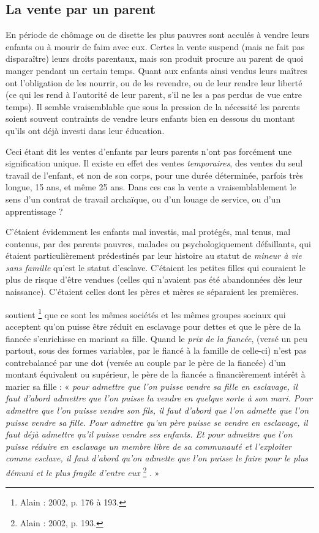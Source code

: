 \subsection{La vente par un parent}

En période de chômage ou de disette les plus pauvres sont acculés
à vendre leurs enfants ou à mourir de faim avec eux. Certes la vente suspend
(mais ne fait pas disparaître) leurs droits parentaux, mais son produit
procure au parent de quoi manger pendant un certain temps. Quant
aux enfants ainsi vendus leurs maîtres ont l'obligation de les nourrir, ou
de les revendre, ou de leur rendre leur liberté (ce qui les rend à l'autorité
de leur parent, s'il ne les a pas perdus de vue entre temps). Il semble vraisemblable
que sous la pression de la nécessité les parents soient souvent
contraints de vendre leurs enfants bien en dessous du montant qu'ils ont
déjà investi dans leur éducation.

Ceci étant dit les ventes d'enfants par leurs parents n'ont pas forcément
une signification unique. Il existe en effet des ventes \emph{temporaires},
des ventes du seul travail de l'enfant, et non de son corps, pour une durée
déterminée, parfois très longue, 15 ans, et même 25 ans. Dans ces cas
la vente a vraisemblablement le sens d'un contrat de travail archaïque, ou
d'un louage de service, ou d'un apprentissage ?

C'étaient évidemment les enfants mal investis, mal protégés, mal
tenus, mal contenus, par des parents pauvres, malades ou psychologiquement
défaillants, qui étaient particulièrement prédestinés par leur histoire
au statut de \emph{mineur à vie sans famille} qu'est le statut d'esclave. C'étaient les
petites filles qui couraient le plus de risque d'être vendues (celles qui
n'avaient pas été abandonnées dès leur naissance). C'étaient celles dont
les pères et mères se séparaient les premières.

 soutient%
\footnote{Alain  : 2002, p. 176 à 193.} 
que ce sont les mêmes sociétés et les mêmes
groupes sociaux qui acceptent qu'on puisse être réduit en esclavage
pour dettes et que le père de la fiancée s'enrichisse en mariant sa fille.
Quand le \emph{prix de la fiancée}, (versé un peu partout, sous des formes variables,
par le fiancé à la famille de celle-ci) n'est pas contrebalancé par une
dot (versée au couple par le père de la fiancée) d'un montant équivalent
ou supérieur, le père de la fiancée a financièrement intérêt à marier sa fille :
« \emph{pour admettre que l'on puisse vendre sa fille en esclavage, il faut d'abord admettre
que l'on puisse la vendre en quelque sorte à son mari. Pour admettre que l'on puisse
vendre son fils, il faut d'abord que l'on admette que l'on puisse vendre sa fille. Pour
admettre qu'un père puisse se vendre en esclavage, il faut déjà admettre qu'il puisse
vendre ses enfants. Et pour admettre que l'on puisse réduire en esclavage un membre
libre de sa communauté et l'exploiter comme esclave, il faut d'abord qu'on admette que
l'on puisse le faire pour le plus démuni et le plus fragile d'entre eux}%
\footnote{Alain  : 2002, p. 193.}%
. »

